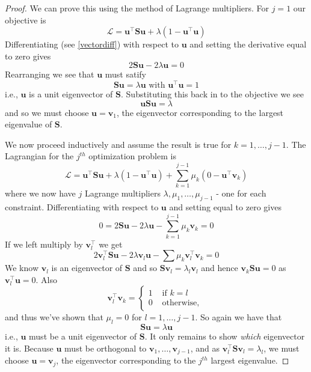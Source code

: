 \documentclass[]{book}
\theoremstyle{definition}
\theoremstyle{definition}
\theoremstyle{definition}
\theoremstyle{remark}
\begin{document}
\begin{proof}
{}We can prove this using the method of Lagrange multipliers. For \(j=1\) our objective is
\[\mathcal{L} = \mathbf u^\top  \mathbf S\mathbf u+\lambda(1-\mathbf u^\top \mathbf u)\]
Differentiating (see \ref{vectordiff}) with respect to \(\mathbf u\) and setting the derivative equal to zero gives
\[2\mathbf S\mathbf u-2\lambda \mathbf u=0\]
Rearranging we see that \(\mathbf u\) must satify
\[\mathbf S\mathbf u=\lambda \mathbf u\mbox{ with } \mathbf u^\top \mathbf u=1\]
i.e., \(\mathbf u\) is a unit eigenvector of \(\mathbf S\). Substituting this back in to the objective we see
\[\mathbf u\mathbf S\mathbf u= \lambda\]
and so we must choose \(\mathbf u=\mathbf v_1\), the eigenvector corresponding to the largest eigenvalue of \(\mathbf S\).

We now proceed inductively and assume the result is true for \(k=1, \ldots, j-1\). The Lagrangian for the \(j^{th}\) optimization problem is
\[\mathcal{L} = \mathbf u^\top  \mathbf S\mathbf u+\lambda(1-\mathbf u^\top \mathbf u) +\sum_{k=1}^{j-1}\mu_k (0-\mathbf u^\top \mathbf v_k)\]
where we now have \(j\) Lagrange multipliers \(\lambda, \mu_1, \ldots, \mu_{j-1}\) - one for each constraint.
Differentiating with respect to \(\mathbf u\) and setting equal to zero gives
\[0 = 2\mathbf S\mathbf u- 2\lambda \mathbf u- \sum_{k=1}^{j-1} \mu_k\mathbf v_k=0 \]
If we left multiply by \(\mathbf v_l^\top\) we get
\[2\mathbf v_l^\top \mathbf S\mathbf u- 2\lambda \mathbf v_l \mathbf u- \sum \mu_k \mathbf v_l^\top \mathbf v_k =0\]
We know \(\mathbf v_l\) is an eigenvector of \(\mathbf S\) and so \(\mathbf S\mathbf v_l=\lambda_l \mathbf v_l\) and hence \(\mathbf v_k \mathbf S\mathbf u=0\) as \(\mathbf v_l^\top \mathbf u=0\). Also \[\mathbf v_l^\top\mathbf v_k=\begin{cases}1 &\mbox{ if } k=l\\
0 &\mbox{ otherwise, }\end{cases}\] and thus we've shown that \(\mu_l=0\) for \(l=1, \ldots, j-1\). So again we have that \[\mathbf S\mathbf u= \lambda \mathbf u\]
i.e., \(\mathbf u\) must be a unit eigenvector of \(\mathbf S\). It only remains to show \emph{which} eigenvector it is. Because \(\mathbf u\) must be orthogonal to \(\mathbf v_1, \ldots, \mathbf v_{j-1}\),
and as \(\mathbf v_l^\top \mathbf S\mathbf v_l = \lambda_l\), we must choose \(\mathbf u=\mathbf v_j\), the eigenvector corresponding to the \(j^{th}\) largest eigenvalue.
\end{proof}
\end{document}
